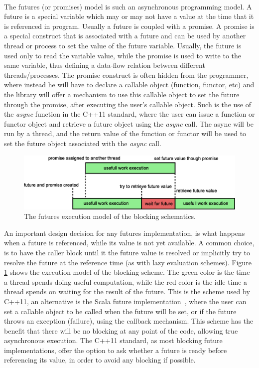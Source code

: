 \paragraph{}
The futures (or promises) model is such an asynchronous programming model.  A future is a special variable which may 
or may not have a value at the time that it is referenced in program.  Usually a future is coupled with a promise.  
A promise is a special construct that is associated with a future and can be used by another thread or process to 
set the value of the future variable.  Usually, the future is used only to read the variable value, while the 
promise is used to write to the same variable, thus defining a data-flow relation between different threads/processes.
The promise construct is often hidden from the programmer, where instead he will have to declare a callable object
(function, functor, etc) and the library will offer a mechanism to use this callable object to set the future through 
the promise, after executing the user's callable object.  Such is the use of the \emph{async} function in the C++11 
standard, where the user can issue a function or functor object and retrieve a future object using the \emph{async} call.
The async will be run by a thread, and the return value of the function or functor will be used to set the future object 
associated with the \emph{async} call.   

\begin{figure}[!ht]
\includegraphics[width=\columnwidth]{figures/futures_blocking}
\caption{
The futures execution model of the blocking schematics.}
\label{fig:futures_blocking}
\end{figure}

An important design decision for any futures implementation, is what happens when a future is referenced, while its value
is not yet available.  A common choice, is to have the caller block until it the future value is resolved or implicitly
try to resolve the future at the reference time (as with lazy evaluation schemes).  Figure \ref{fig:futures_blocking} 
shows the execution model of the blocking scheme.  The green color is the time a thread spends doing useful computation, 
while the red color is the idle time a thread spends on waiting for the result of the future. This is the scheme used by C++11, 
an alternative is the Scala future implementation~\cite{Scala:Futures}, where the user can set a callable object to be
called when the future will be set, or if the future throws an exception (failure), using the callback mechanism.  This scheme
has the benefit that there will be no blocking at any point of the code, allowing true asynchronous execution.  The C++11
standard, as most blocking future implementations, offer the option to ask whether a future is ready before referencing its 
value, in order to avoid any blocking if possible. 


